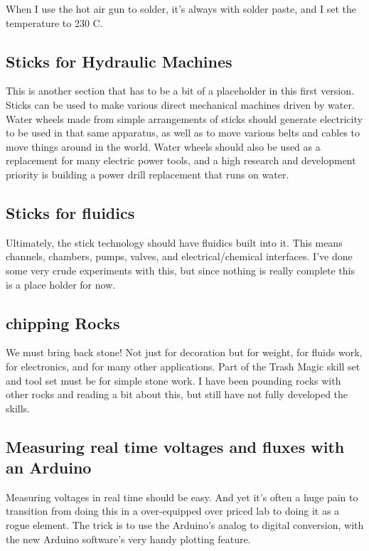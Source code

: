 When I use the hot air gun to solder, it's always with solder paste, and
I set the temperature to 230 C.

\subsection{Sticks for Hydraulic
Machines}\label{sticks-for-hydraulic-machines}

This is another section that has to be a bit of a placeholder in this
first version. Sticks can be used to make various direct mechanical
machines driven by water. Water wheels made from simple arrangements of
sticks should generate electricity to be used in that same apparatus, as
well as to move various belts and cables to move things around in the
world. Water wheels should also be used as a replacement for many
electric power tools, and a high research and development priority is
building a power drill replacement that runs on water.

\subsection{Sticks for fluidics}\label{sticks-for-fluidics}

Ultimately, the stick technology should have fluidics built into it.
This means channels, chambers, pumps, valves, and electrical/chemical
interfaces. I've done some very crude experiments with this, but since
nothing is really complete this is a place holder for now.

\subsection{chipping Rocks}\label{chipping-rocks}

We must bring back stone! Not just for decoration but for weight, for
fluids work, for electronics, and for many other applications. Part of
the Trash Magic skill set and tool set must be for simple stone work. I
have been pounding rocks with other rocks and reading a bit about this,
but still have not fully developed the skills.

\subsection{Measuring real time voltages and fluxes with an
Arduino}\label{measuring-real-time-voltages-and-fluxes-with-an-arduino}

Measuring voltages in real time should be easy. And yet it's often a
huge pain to transition from doing this in a over-equipped over priced
lab to doing it as a rogue element. The trick is to use the Arduino's
analog to digital conversion, with the new Arduino software's very handy
plotting feature.

